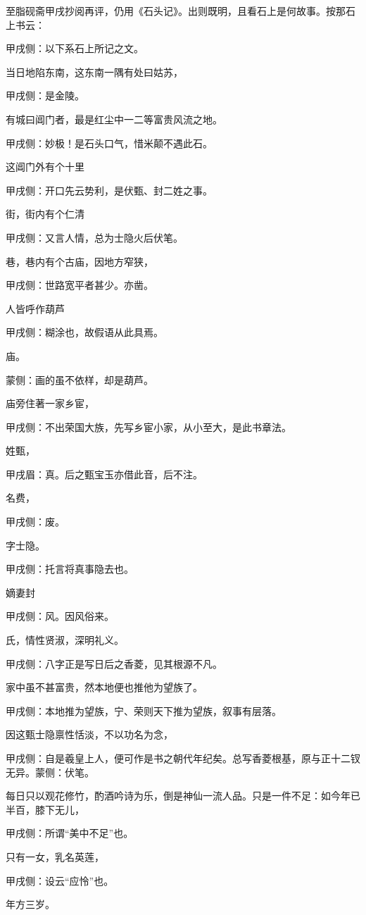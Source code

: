 \begin{parag}
    至脂砚斋甲戌抄阅再评，仍用《石头记》。出则既明，且看石上是何故事。按那石上书云：\begin{note}甲戌侧：以下系石上所记之文。\end{note}
\end{parag}


\begin{parag}
    当日地陷东南，这东南一隅有处曰姑苏，\begin{note}甲戌侧：是金陵。\end{note}有城曰阊门者，最是红尘中一二等富贵风流之地。\begin{note}甲戌侧：妙极！是石头口气，惜米颠不遇此石。\end{note}这阊门外有个十里\begin{note}甲戌侧：开口先云势利，是伏甄、封二姓之事。\end{note}街，街内有个仁清\begin{note}甲戌侧：又言人情，总为士隐火后伏笔。\end{note}巷，巷内有个古庙，因地方窄狭，\begin{note}甲戌侧：世路宽平者甚少。亦凿。\end{note}人皆呼作葫芦\begin{note}甲戌侧：糊涂也，故假语从此具焉。\end{note}庙。\begin{note}蒙侧：画的虽不依样，却是葫芦。\end{note}庙旁住著一家乡宦，\begin{note}甲戌侧：不出荣国大族，先写乡宦小家，从小至大，是此书章法。\end{note}姓甄，\begin{note}甲戌眉：真。后之甄宝玉亦借此音，后不注。\end{note}名费，\begin{note}甲戌侧：废。\end{note}字士隐。\begin{note}甲戌侧：托言将真事隐去也。\end{note}嫡妻封\begin{note}甲戌侧：风。因风俗来。\end{note}氏，情性贤淑，深明礼义。\begin{note}甲戌侧：八字正是写日后之香菱，见其根源不凡。\end{note}家中虽不甚富贵，然本地便也推他为望族了。\begin{note}甲戌侧：本地推为望族，宁、荣则天下推为望族，叙事有层落。\end{note}因这甄士隐禀性恬淡，不以功名为念，\begin{note}甲戌侧：自是羲皇上人，便可作是书之朝代年纪矣。总写香菱根基，原与正十二钗无异。蒙侧：伏笔。\end{note}每日只以观花修竹，酌酒吟诗为乐，倒是神仙一流人品。只是一件不足：如今年已半百，膝下无儿，\begin{note}甲戌侧：所谓“美中不足”也。\end{note}只有一女，乳名英莲，\begin{note}甲戌侧：设云“应怜”也。\end{note}年方三岁。
\end{parag}


